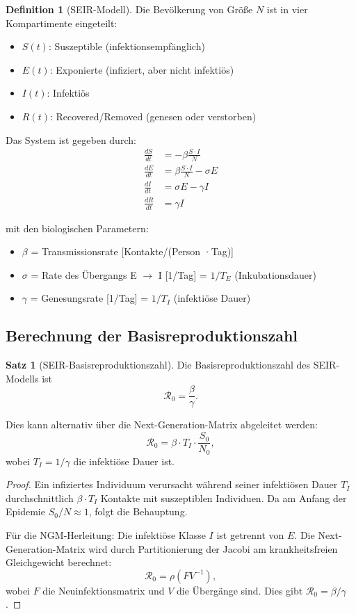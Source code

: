 ﻿\documentclass[a4paper,12pt]{article}
\theoremstyle{definition}
\newtheorem{definition}{Definition}
\newtheorem{satz}{Satz}
\begin{document}
\begin{definition}[SEIR-Modell]
Die Bevölkerung von Größe $N$ ist in vier Kompartimente eingeteilt:
\begin{itemize}
\item $S(t)$: Suszeptible (infektionsempfänglich)
\item $E(t)$: Exponierte (infiziert, aber nicht infektiös)
\item $I(t)$: Infektiös
\item $R(t)$: Recovered/Removed (genesen oder verstorben)
\end{itemize}

Das System ist gegeben durch:
\begin{align}
\frac{dS}{dt} &= -\beta \frac{S \cdot I}{N} \label{eq:seir_s}\\
\frac{dE}{dt} &= \beta \frac{S \cdot I}{N} - \sigma E \label{eq:seir_e}\\
\frac{dI}{dt} &= \sigma E - \gamma I \label{eq:seir_i}\\
\frac{dR}{dt} &= \gamma I \label{eq:seir_r}
\end{align}

mit den biologischen Parametern:
\begin{itemize}
\item $\beta$ = Transmissionsrate [Kontakte/(Person ·Tag)]
\item $\sigma$ = Rate des Übergangs E $\to$ I [1/Tag] = $1/T_E$ (Inkubationsdauer)
\item $\gamma$ = Genesungsrate [1/Tag] = $1/T_I$ (infektiöse Dauer)
\end{itemize}
\end{definition}

\subsection{Berechnung der Basisreproduktionszahl}

\begin{satz}[SEIR-Basisreproduktionszahl]
Die Basisreproduktionszahl des SEIR-Modells ist
\[
\mathcal{R}_0 = \frac{\beta}{\gamma}.
\]

Dies kann alternativ über die Next-Generation-Matrix abgeleitet werden:
\[
\mathcal{R}_0 = \beta \cdot T_I \cdot \frac{S_0}{N_0},
\]
wobei $T_I = 1/\gamma$ die infektiöse Dauer ist.
\end{satz}

\begin{proof}
Ein infiziertes Individuum verursacht während seiner infektiösen Dauer $T_I$ durchschnittlich $\beta \cdot T_I$ Kontakte mit suszeptiblen Individuen. Da am Anfang der Epidemie $S_0/N \approx 1$, folgt die Behauptung.

Für die NGM-Herleitung: Die infektiöse Klasse $I$ ist getrennt von $E$. Die Next-Generation-Matrix wird durch Partitionierung der Jacobi am krankheitsfreien Gleichgewicht berechnet:
\[
\mathcal{R}_0 = \rho(FV^{-1}),
\]
wobei $F$ die Neuinfektionsmatrix und $V$ die Übergänge sind. Dies gibt $\mathcal{R}_0 = \beta / \gamma$.
\end{proof}
\end{document}
